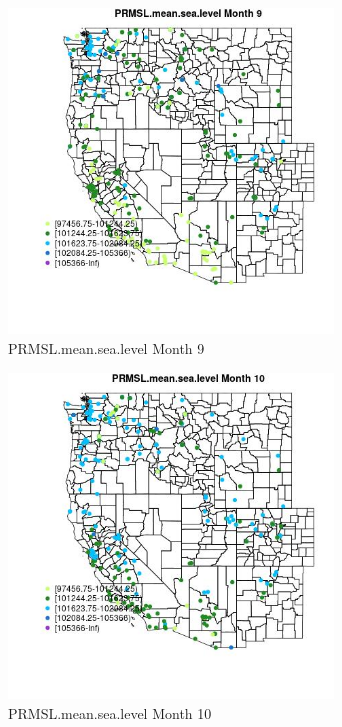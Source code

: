 \begin{figure} 
\centering  
\includegraphics[width=0.77\textwidth]{Code_Outputs/Report_ML_input_PM25_Step4_part_e_de_duplicated_aveswNAs_MapObsMo9PRMSLmeansealevel.jpg} 
\caption{\label{fig:Report_ML_input_PM25_Step4_part_e_de_duplicated_aveswNAsMapObsMo9PRMSLmeansealevel}PRMSL.mean.sea.level Month 9} 
\end{figure} 
 

\begin{figure} 
\centering  
\includegraphics[width=0.77\textwidth]{Code_Outputs/Report_ML_input_PM25_Step4_part_e_de_duplicated_aveswNAs_MapObsMo10PRMSLmeansealevel.jpg} 
\caption{\label{fig:Report_ML_input_PM25_Step4_part_e_de_duplicated_aveswNAsMapObsMo10PRMSLmeansealevel}PRMSL.mean.sea.level Month 10} 
\end{figure} 
 

